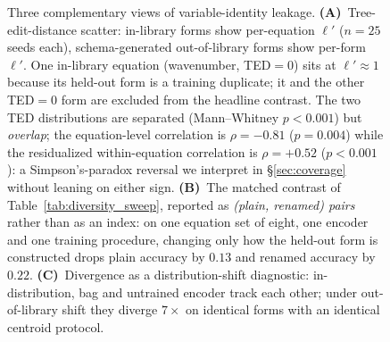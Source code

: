 \begin{figure}[t]
{\begin{tikzpicture}[
  font=\small,
  lbl/.style={font=\footnotesize, align=center},
  hdrlbl/.style={font=\small\bfseries, align=center},
]
\end{tikzpicture}%
}
\caption{Three complementary views of variable-identity leakage. \textbf{(A)}~Tree-edit-distance scatter: in-library forms show per-equation $\ell'$ ($n{=}25$ seeds each), schema-generated out-of-library forms show per-form $\ell'$. One in-library equation (wavenumber, TED$=0$) sits at $\ell'{\approx}1$ because its held-out form is a training duplicate; it and the other TED$=0$ form are excluded from the headline contrast. The two TED distributions are separated (Mann--Whitney $p{<}0.001$) but \emph{overlap}; the equation-level correlation is $\rho{=}{-}0.81$ ($p{=}0.004$) while the residualized within-equation correlation is $\rho{=}{+}0.52$ ($p{<}0.001$): a Simpson's-paradox reversal we interpret in \S\ref{sec:coverage} without leaning on either sign. \textbf{(B)}~The matched contrast of Table~\ref{tab:diversity_sweep}, reported as \emph{(plain, renamed) pairs} rather than as an index: on one equation set of eight, one encoder and one training procedure, changing only how the held-out form is constructed drops plain accuracy by $0.13$ and renamed accuracy by $0.22$. \textbf{(C)}~Divergence as a distribution-shift diagnostic: in-distribution, bag and untrained encoder track each other; under out-of-library shift they diverge $7\times$ on identical forms with an identical centroid protocol.}
\label{fig:overview}
\end{figure}
